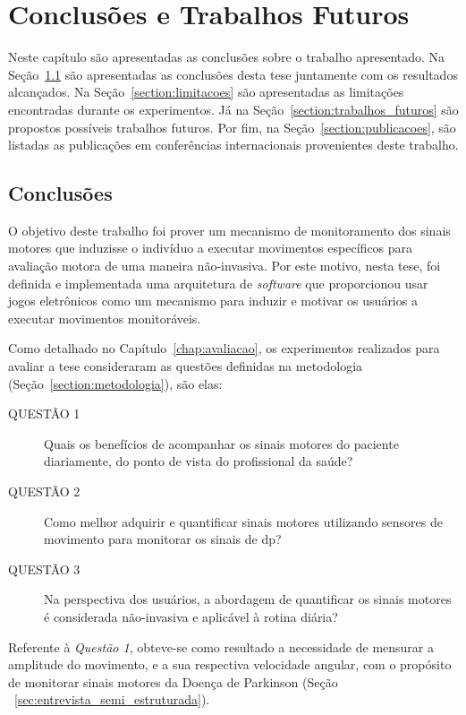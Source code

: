 \chapter{Conclusões e Trabalhos Futuros}\label{chapter:conclusoes_futuros}
Neste capítulo são apresentadas as conclusões sobre o trabalho apresentado. Na Seção~\ref{section:conclusoes} são apresentadas as conclusões desta tese juntamente com os resultados alcançados. Na Seção~\ref{section:limitacoes} são apresentadas as limitações encontradas durante os experimentos. Já na Seção~\ref{section:trabalhos_futuros} são propostos possíveis trabalhos futuros. Por fim, na Seção~\ref{section:publicacoes}, são listadas as publicações em conferências internacionais provenientes deste trabalho.




\section{Conclusões}\label{section:conclusoes}
O objetivo deste trabalho foi prover um mecanismo de monitoramento dos sinais motores que induzisse o indivíduo a executar movimentos específicos para avaliação motora de uma maneira não-invasiva. Por este motivo, nesta tese, foi definida e implementada uma arquitetura de \textit{software} que proporcionou usar jogos eletrônicos como um mecanismo para induzir e motivar os usuários a executar movimentos monitoráveis.


Como detalhado no Capítulo~\ref{chap:avaliacao}, os experimentos realizados para avaliar a tese consideraram as questões definidas na metodologia (Seção~\ref{section:metodologia}), são elas:
	\begin{description}
	\item[QUESTÃO 1] Quais os benefícios de acompanhar os sinais motores do paciente diariamente, do ponto de vista do profissional da saúde?
	\item[QUESTÃO 2] Como melhor adquirir e quantificar sinais motores utilizando sensores de movimento para monitorar os sinais de \ac{dp}?
	\item[QUESTÃO 3] Na perspectiva dos usuários, a abordagem de quantificar os sinais motores é considerada não-invasiva e aplicável à rotina diária?
	\end{description}



Referente à \textit{Questão 1}, obteve-se como resultado a necessidade de mensurar a amplitude do movimento, e a sua respectiva velocidade angular, com o propósito de monitorar sinais motores da Doença de Parkinson (Seção ~\ref{sec:entrevista_semi_estruturada}).

